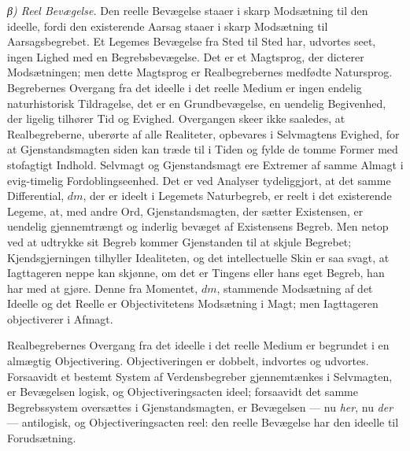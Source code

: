 \documentclass[12pt,a4paper]{book}
\newcommand{\subrunin}[1]{\emph{#1}\hspace{0.4em}}
\begin{document}
\subrunin{β) Reel Bevægelse.} Den reelle Bevægelse staaer i skarp
Modsætning til den ideelle, fordi den existerende Aarsag staaer i skarp
Modsætning til Aarsagsbegrebet. Et Legemes Bevægelse fra Sted til Sted
har, udvortes seet, ingen Lighed med en Begrebsbevægelse. Det er et
Magtsprog, der dicterer Modsætningen; men dette Magtsprog er
Realbegrebernes medfødte Natursprog. Begrebernes Overgang fra det
ideelle i det reelle Medium er ingen endelig naturhistorisk Tildragelse,
det er en Grundbevægelse, en uendelig Begivenhed, der ligelig tilhører
Tid og Evighed. Overgangen skeer ikke saaledes, at Realbegreberne,
uberørte af alle Realiteter, opbevares i Selvmagtens Evighed, for at
Gjenstandsmagten siden kan træde til i Tiden og fylde de tomme Former
med
stofagtigt Indhold. Selvmagt og Gjenstandsmagt ere Extremer af samme
Almagt i evig-timelig Fordoblingseenhed. Det er ved Analyser
tydeliggjort, at det samme Differential, $dm$, der er ideelt i Legemets
Naturbegreb, er reelt i det existerende Legeme, at, med andre Ord,
Gjenstandsmagten, der sætter Existensen, er uendelig gjennemtrængt og
inderlig bevæget af Existensens Begreb. Men netop ved at udtrykke sit
Begreb kommer Gjenstanden til at skjule Begrebet; Kjendsgjerningen
tilhyller Idealiteten, og det intellectuelle Skin er saa svagt, at
Iagttageren neppe kan skjønne, om det er Tingens eller hans eget
Begreb, han har med at gjøre. Denne fra Momentet, $dm$, stammende
Modsætning af det Ideelle og det Reelle er Objectivitetens Modsætning i
Magt; men Iagttageren objectiverer i Afmagt.

Realbegrebernes Overgang fra det ideelle i det reelle Medium er
begrundet i en almægtig Objectivering. Objectiveringen er dobbelt,
indvortes og udvortes. Forsaavidt et bestemt System af Verdensbegreber
gjennemtænkes i Selvmagten, er Bevægelsen logisk, og Objectiveringsacten
ideel; forsaavidt det samme Begrebssystem oversættes i Gjenstandsmagten,
er Bevægelsen --- nu \emph{her}, nu \emph{der} --- antilogisk, og
Objectiveringsacten reel: den reelle Bevægelse har den ideelle til
Forudsætning.
\end{document}
